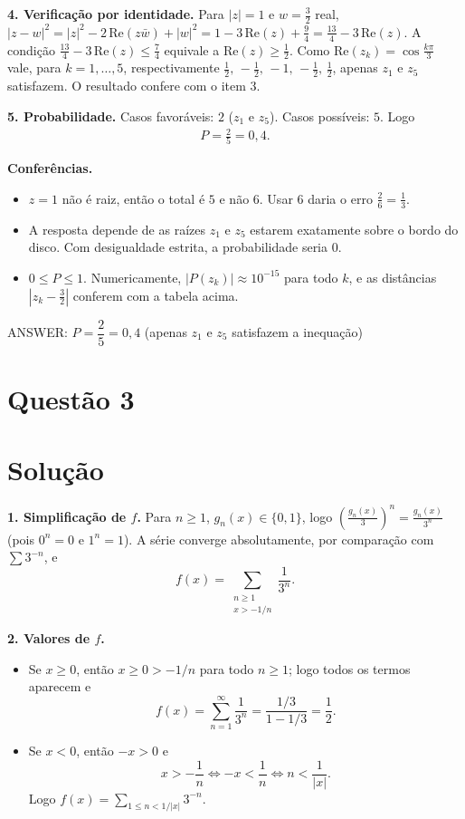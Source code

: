 \documentclass{article}%
\begin{document}
\textbf{4. Verificação por identidade.} Para $|z|=1$ e $w=\frac32$ real, $|z-w|^2=|z|^2-2\,\mathrm{Re}(z\bar w)+|w|^2=1-3\,\mathrm{Re}(z)+\frac94=\frac{13}{4}-3\,\mathrm{Re}(z)$. A condição $\frac{13}{4}-3\,\mathrm{Re}(z)\le\frac74$ equivale a $\mathrm{Re}(z)\ge\frac12$. Como $\mathrm{Re}(z_k)=\cos\frac{k\pi}{3}$ vale, para $k=1,\dots,5$, respectivamente $\frac12,\,-\frac12,\,-1,\,-\frac12,\,\frac12$, apenas $z_1$ e $z_5$ satisfazem. O resultado confere com o item 3.

\textbf{5. Probabilidade.} Casos favoráveis: $2$ ($z_1$ e $z_5$). Casos possíveis: $5$. Logo
\begin{align*}
P=\frac{2}{5}=0{,}4 .
\end{align*}

\textbf{Conferências.}
\begin{itemize}
\item $z=1$ não é raiz, então o total é $5$ e não $6$. Usar $6$ daria o erro $\frac{2}{6}=\frac13$.
\item A resposta depende de as raízes $z_1$ e $z_5$ estarem exatamente sobre o bordo do disco. Com desigualdade estrita, a probabilidade seria $0$.
\item $0\le P\le 1$. Numericamente, $|P(z_k)|\approx 10^{-15}$ para todo $k$, e as distâncias $|z_k-\frac32|$ conferem com a tabela acima.
\end{itemize}

ANSWER: $P=\dfrac{2}{5}=0{,}4$ (apenas $z_1$ e $z_5$ satisfazem a inequação)%
\newpage%
\section*{Questão 3}

\section*{Solução}

\textbf{1. Simplificação de $f$.} Para $n\ge 1$, $g_n(x)\in\{0,1\}$, logo $\left(\frac{g_n(x)}{3}\right)^n=\frac{g_n(x)}{3^n}$ (pois $0^n=0$ e $1^n=1$). A série converge absolutamente, por comparação com $\sum 3^{-n}$, e
\[
f(x)=\sum_{\substack{n\ge 1\\ x>-1/n}}\frac{1}{3^n}.
\]

\textbf{2. Valores de $f$.}
\begin{itemize}
\item Se $x\ge 0$, então $x\ge 0>-1/n$ para todo $n\ge 1$; logo todos os termos aparecem e
\[
f(x)=\sum_{n=1}^{\infty}\frac{1}{3^n}=\frac{1/3}{1-1/3}=\frac12 .
\]
\item Se $x<0$, então $-x>0$ e
\[
x>-\frac1n\iff -x<\frac1n\iff n<\frac{1}{|x|}.
\]
Logo $f(x)=\sum_{1\le n<1/|x|}3^{-n}$.
\end{itemize}
\end{document}
